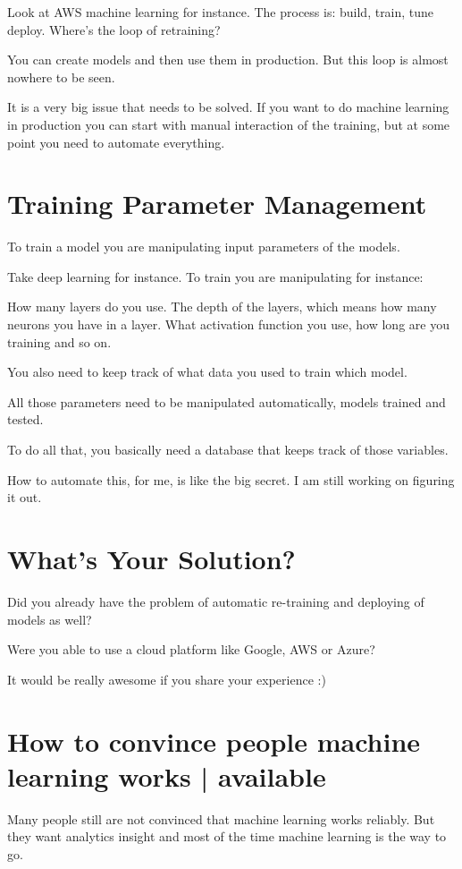 \documentclass[12pt, numbers=noenddot]{scrreprt} %
\begin{document}
Look at AWS machine learning for instance. The process is: build, train, tune deploy. Where’s the loop of retraining?

You can create models and then use them in production. But this loop is almost nowhere to be seen.

It is a very big issue that needs to be solved. If you want to do machine learning in production you can start with manual interaction of the training, but at some point you need to automate everything.

\section{Training Parameter Management}

To train a model you are manipulating input parameters of the models.

Take deep learning for instance. To train you are manipulating for instance:

How many layers do you use. The depth of the layers, which means how many neurons you have in a layer. What activation function you use, how long are you training and so on.

You also need to keep track of what data you used to train which model.

All those parameters need to be manipulated automatically, models trained and tested.

To do all that, you basically need a database that keeps track of those variables.

How to automate this, for me, is like the big secret. I am still working on figuring it out.

\section{What’s Your Solution?}

Did you already have the problem of automatic re-training and deploying of models as well?

Were you able to use a cloud platform like Google, AWS or Azure?

It would be really awesome if you share your experience :)

\section{How to convince people machine learning works | available}
Many people still are not convinced that machine learning works reliably. But they want analytics insight and most of the time machine learning is the way to go.
\end{document}
